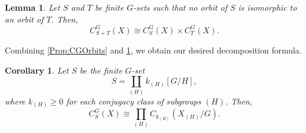 \documentclass[11pt]{amsart}
\makeatletter
\newtheorem{lemma}[equation]{Lemma}
\newtheorem{corollary}[equation]{Corollary}
\newtheorem{proposition}[equation]{Proposition}
\theoremstyle{definition}
\numberwithin{equation}{subsection} %
\newcommand{\Conf}{\operatorname{Conf}}
\newcommand{\Aut}{\operatorname{Aut}}
\newcommand{\x}{\times}
\newcommand{\switchmargin}{
\if@reversemargin
\normalmarginpar
\else
\reversemarginpar
\fi
}
\newcommand{\highlighteva}[1]{\ifmmode{\text{\sethlcolor{llgray}\hl{$#1$}}}\else{\sethlcolor{llteal}\hl{#1}}\fi}
\newcommand{\EvaNoteHl}[2]{\marginnote{\smaller \smaller \color{teal}
#2}{\highlighteva{#1}}\switchmargin}
\makeatother
\begin{document}
\begin{lemma}\label{Lem:CGProduct}
Let $S$ and $T$ be finite $G$-sets such that no orbit of $S$ is isomorphic to an orbit of $T$. Then,
$$ C^G_{S+T}(X)\cong C^G_S(X)\times C^G_T(X). $$
\end{lemma}


Combining \cref{Prop:CGOrbits} and \cref{Lem:CGProduct}, we obtain our desired decomposition formula.

\begin{corollary} \label{Cor:CGSDecomp}
Let $S$ be the finite $G$-set
$$ S = \coprod_{(H)} k_{(H)}[G/H], $$
where $k_{(H)}\geq 0$ for each conjugacy class of subgroups $(H)$. Then,
$$ C^G_S(X) \cong \prod_{(H)} C_{k_{(H)}} (X_{(H)}/G ). $$
\end{corollary}


\end{document}
